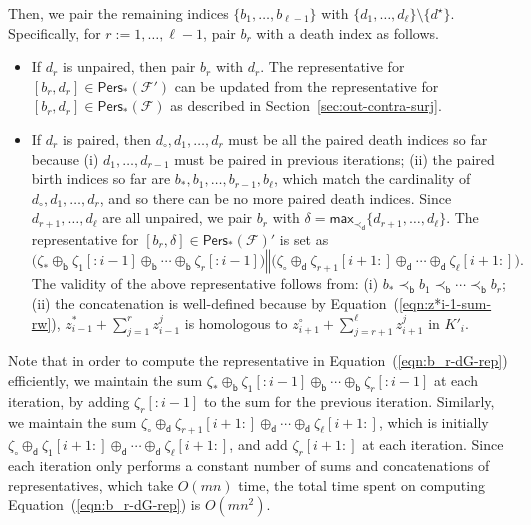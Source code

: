 \documentclass[letterpaper,11pt]{article}
\theoremstyle{mythmstyle}
\theoremstyle{mydefstyle}
\theoremstyle{plain}
\theoremstyle{definition}
\newcommand{\Pers}{\mathsf{Pers}}
\newcommand{\<}[1]{\langle #1\rangle}
\newcommand{\Set}[1]{\{#1\}}
\newcommand{\Max}{\mathsf{max}}
\newcommand{\Fcal}{\mathcal{F}}
\newcommand{\dG}{\delta}
\newcommand{\filtcnt}{m}
\newcommand{\simpcnt}{n}
\newcommand{\bles}{\prec_{\mathsf{b}}}
\newcommand{\dles}{\prec_{\mathsf{d}}}
\newcommand{\brepsum}{\oplus_{\mathsf{b}}}
\newcommand{\drepsum}{\oplus_{\mathsf{d}}}
\newcommand{\cyc}{z}
\newcommand{\rseq}{\zeta}
\newcommand{\rconcat}{\mathbin\Vert}
\newcommand{\rsprefix}[1]{{[:\!#1]}}
\newcommand{\rssuffix}[1]{{[#1\!:]}}
\begin{document}
Then,
we pair the 
remaining indices
$\Set{b_1,\ldots,b_{\ell-1}}$
with
$\Set{d_1,\ldots,d_{\ell}}\setminus\Set{d^\star}$.
Specifically,
for $r:=1,\ldots,\ell-1$,
pair $b_r$ with a death index as follows.
\begin{itemize}
    \item If $d_r$ is unpaired, then pair $b_r$ with $d_r$.
    The representative for $[b_r,d_r]\in\Pers_*(\Fcal')$
    can be updated from the representative for $[b_r,d_r]\in\Pers_*(\Fcal)$
    as described in Section~\ref{sec:out-contra-surj}.
    
    \item If $d_r$ is paired, then 
    $d_\circ,d_1,\ldots,d_r$
    must be all the paired death indices so far
    because
    (i) $d_1,\ldots,d_{r-1}$ must be paired in previous iterations;
    (ii) the paired birth indices so far are $b_*,b_1,\ldots,b_{r-1},b_\ell$,
    which match the cardinality of 
    $d_\circ,d_1,\ldots,d_r$,
    and so there can be no more paired death indices.    
    Since $d_{r+1},\ldots,d_\ell$ are all unpaired, 
    we pair $b_r$ with $\dG=\Max_{\dles}\Set{d_{r+1},\ldots,d_\ell}$.
    The representative for $[b_r,\dG]\in\Pers_*(\Fcal)'$ is set as
    \begin{equation}
    \label{eqn:b_r-dG-rep}
    \big(\rseq_*\brepsum\rseq_1\rsprefix{i-1}\brepsum
    \cdots\brepsum\rseq_r\rsprefix{i-1}\big)\rconcat
    \big(\rseq_\circ\drepsum\rseq_{r+1}\rssuffix{i+1}\drepsum
    \cdots\drepsum\rseq_\ell\rssuffix{i+1}\big).
    \end{equation}
    The validity of the above representative follows from:
    (i) $b_*\bles b_1\bles\cdots\bles b_r$;
    (ii) the concatenation is well-defined because by Equation~(\ref{eqn:z*i-1-sum-rw}), $\cyc^*_{i-1}+\sum_{j=1}^r{\cyc}^j_{i-1}$ is homologous to
    $\cyc^\circ_{i+1}+\sum_{j=r+1}^\ell{\cyc}^j_{i+1}$ in $K'_i$.
\end{itemize}

Note that in order to compute the representative in Equation~(\ref{eqn:b_r-dG-rep})
efficiently,
we maintain the sum $\rseq_*\brepsum\rseq_1\rsprefix{i-1}\brepsum
\cdots\brepsum\rseq_r\rsprefix{i-1}$ at each iteration,
by adding $\rseq_r\rsprefix{i-1}$ to the sum for the previous iteration.
Similarly,
we maintain the sum $\rseq_\circ\drepsum\rseq_{r+1}\rssuffix{i+1}\drepsum
\cdots\drepsum\rseq_\ell\rssuffix{i+1}$,
which is initially $\rseq_\circ\drepsum\rseq_{1}\rssuffix{i+1}\drepsum
\cdots\drepsum\rseq_\ell\rssuffix{i+1}$,
and add $\rseq_{r}\rssuffix{i+1}$ at each iteration.
Since each iteration only performs a constant number of 
sums and concatenations of representatives,
which take $O(\filtcnt\simpcnt)$ time,
the total time spent on computing
Equation~(\ref{eqn:b_r-dG-rep}) is $O(\filtcnt\simpcnt^2)$.
\end{document}
